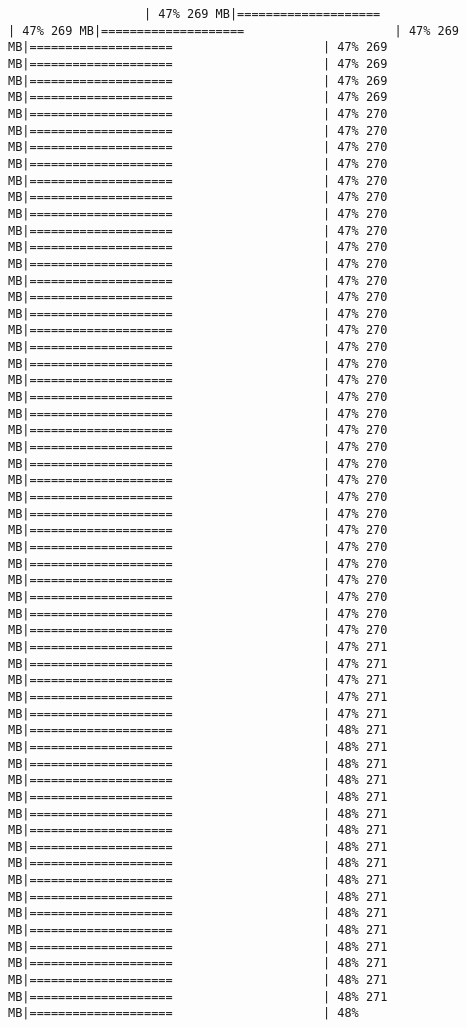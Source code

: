\documentclass[
]{article}
\begin{document}
\begin{verbatim}
                   | 47% 269 MB|====================                     | 47% 269 MB|====================                     | 47% 269 MB|====================                     | 47% 269 MB|====================                     | 47% 269 MB|====================                     | 47% 269 MB|====================                     | 47% 269 MB|====================                     | 47% 270 MB|====================                     | 47% 270 MB|====================                     | 47% 270 MB|====================                     | 47% 270 MB|====================                     | 47% 270 MB|====================                     | 47% 270 MB|====================                     | 47% 270 MB|====================                     | 47% 270 MB|====================                     | 47% 270 MB|====================                     | 47% 270 MB|====================                     | 47% 270 MB|====================                     | 47% 270 MB|====================                     | 47% 270 MB|====================                     | 47% 270 MB|====================                     | 47% 270 MB|====================                     | 47% 270 MB|====================                     | 47% 270 MB|====================                     | 47% 270 MB|====================                     | 47% 270 MB|====================                     | 47% 270 MB|====================                     | 47% 270 MB|====================                     | 47% 270 MB|====================                     | 47% 270 MB|====================                     | 47% 270 MB|====================                     | 47% 270 MB|====================                     | 47% 270 MB|====================                     | 47% 270 MB|====================                     | 47% 270 MB|====================                     | 47% 270 MB|====================                     | 47% 270 MB|====================                     | 47% 270 MB|====================                     | 47% 270 MB|====================                     | 47% 271 MB|====================                     | 47% 271 MB|====================                     | 47% 271 MB|====================                     | 47% 271 MB|====================                     | 47% 271 MB|====================                     | 48% 271 MB|====================                     | 48% 271 MB|====================                     | 48% 271 MB|====================                     | 48% 271 MB|====================                     | 48% 271 MB|====================                     | 48% 271 MB|====================                     | 48% 271 MB|====================                     | 48% 271 MB|====================                     | 48% 271 MB|====================                     | 48% 271 MB|====================                     | 48% 271 MB|====================                     | 48% 271 MB|====================                     | 48% 271 MB|====================                     | 48% 271 MB|====================                     | 48% 271 MB|====================                     | 48% 271 MB|====================                     | 48% 271 MB|====================                     | 48% 
\end{verbatim}
\end{document}
